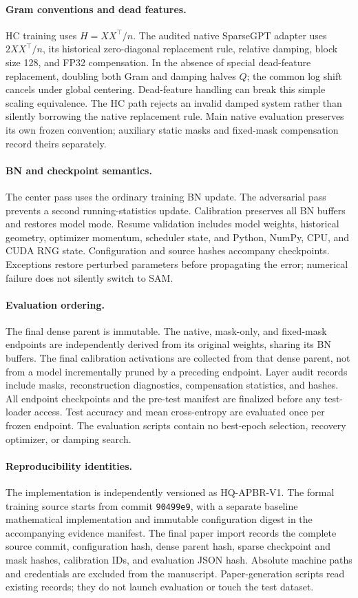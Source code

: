 \paragraph{Gram conventions and dead features.}
HC training uses $H=XX^\top/n$. The audited native SparseGPT adapter uses $2XX^\top/n$, its historical zero-diagonal replacement rule, relative damping, block size 128, and FP32 compensation. In the absence of special dead-feature replacement, doubling both Gram and damping halves $Q$; the common log shift cancels under global centering. Dead-feature handling can break this simple scaling equivalence. The HC path rejects an invalid damped system rather than silently borrowing the native replacement rule. Main native evaluation preserves its own frozen convention; auxiliary static masks and fixed-mask compensation record theirs separately.

\paragraph{BN and checkpoint semantics.}
The center pass uses the ordinary training BN update. The adversarial pass prevents a second running-statistics update. Calibration preserves all BN buffers and restores model mode. Resume validation includes model weights, historical geometry, optimizer momentum, scheduler state, and Python, NumPy, CPU, and CUDA RNG state. Configuration and source hashes accompany checkpoints. Exceptions restore perturbed parameters before propagating the error; numerical failure does not silently switch to SAM.

\paragraph{Evaluation ordering.}
The final dense parent is immutable. The native, mask-only, and fixed-mask endpoints are independently derived from its original weights, sharing its BN buffers. The final calibration activations are collected from that dense parent, not from a model incrementally pruned by a preceding endpoint. Layer audit records include masks, reconstruction diagnostics, compensation statistics, and hashes. All endpoint checkpoints and the pre-test manifest are finalized before any test-loader access. Test accuracy and mean cross-entropy are evaluated once per frozen endpoint. The evaluation scripts contain no best-epoch selection, recovery optimizer, or damping search.

\paragraph{Reproducibility identities.}
The implementation is independently versioned as HQ-APBR-V1. The formal training source starts from commit \texttt{90499e9}, with a separate baseline mathematical implementation and immutable configuration digest in the accompanying evidence manifest. The final paper import records the complete source commit, configuration hash, dense parent hash, sparse checkpoint and mask hashes, calibration IDs, and evaluation JSON hash. Absolute machine paths and credentials are excluded from the manuscript. Paper-generation scripts read existing records; they do not launch evaluation or touch the test dataset.

